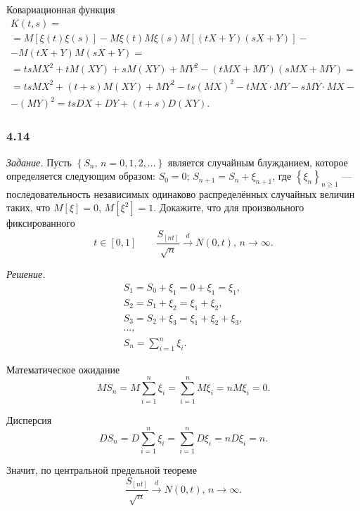 Ковариационная функция
\begin{gather*}
  K \left( t, s \right) = \\
  = M \left[ \xi \left( t \right) \xi \left( s \right) \right] -
  M \xi \left( t \right) M \xi \left( s \right)
  M \left[ \left( tX + Y \right) \left( sX + Y \right) \right] - \\
  - M \left( tX + Y \right) M \left( sX + Y \right) = \\
  = tsMX^2 + tM \left( XY \right) + sM \left( XY \right) + MY^2 -
  \left( tMX + MY \right) \left( sMX + MY \right) = \\
  = tsMX^2 + \left( t + s \right) M \left( XY \right) + MY^2 - ts \left( MX \right)^2 -
  tMX \cdot MY - sMY \cdot MX - \\
  - \left( MY \right)^2 =
  tsDX + DY + \left( t + s \right) D \left( XY \right).
\end{gather*}

\subsubsection*{4.14}

\textit{Задание.}
Пусть $ \left\{ S_n, \, n = 0, 1, 2, \dotsc \right\} $ является случайным блужданием,
которое определяется следующим образом: $S_0 = 0; \, S_{n + 1} = S_n + \xi_{n + 1}$,
где $ \left\{ \xi_n \right\}_{n \geq 1}$ ---
последовательность независимых одинаково распределённых случайных величин таких,
что $M \left[ \xi \right] = 0, \, M \left[ \xi^2 \right] = 1$.
Докажите, что для произвольного фиксированного
$$t \in \left[ 0, 1 \right] \qquad
  \frac{S_{ \left[ nt \right] }}{ \sqrt{n}} \overset{d}{ \to } N \left( 0, t \right), \,
  n \to \infty.$$

\textit{Решение.}
\begin{gather*}
  S_1 = S_0 + \xi_1 = 0 + \xi_1 = \xi_1, \\
  S_2 = S_1 + \xi_2 = \xi_1 + \xi_2, \\
  S_3 = S_2 + \xi_3 = \xi_1 + \xi_2 + \xi_3, \\
  \dotsc, \\
  S_n = \sum \limits_{i = 1}^n \xi_i.
\end{gather*}

Математическое ожидание
$$MS_n =
  M \sum \limits_{i = 1}^n \xi_i =
  \sum \limits_{i = 1}^n M \xi_i =
  nM \xi_i =
  0.$$

Дисперсия
$$DS_n =
  D \sum \limits_{i = 1}^n \xi_i =
  \sum \limits_{i = 1}^n D \xi_i =
  nD \xi_i =
  n.$$

Значит, по центральной предельной теореме
$$ \frac{S_{ \left[ nt \right] }}{ \sqrt{n}} \overset{d}{ \to } N \left( 0, t \right), \,
  n \to \infty.$$
